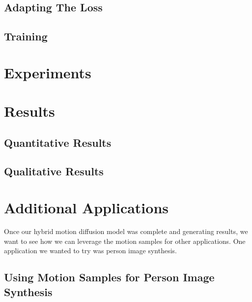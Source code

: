 \documentclass[10pt,twocolumn,letterpaper]{article}
\begin{document}
\subsection{Adapting The Loss}

\subsection{Training}

\section{Experiments}
\label{sec:experiments}

\section{Results}
\label{sec:results}

\subsection{Quantitative Results}

\subsection{Qualitative Results}

\section{Additional Applications}
\label{sec:additional-applications}

Once our hybrid motion diffusion model was complete and generating results, we want to see how we can
leverage the motion samples for other applications. One application we wanted to try was person image 
synthesis. \cite{Bhunia23}

\subsection{Using Motion Samples for Person Image Synthesis}
\end{document}
